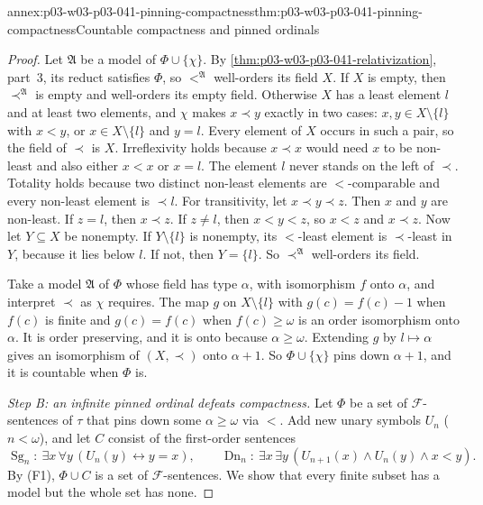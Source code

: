 \begin{annexitem}{annex:p03-w03-p03-041-pinning-compactness}{thm:p03-w03-p03-041-pinning-compactness}{Countable compactness and pinned ordinals}
\begin{proof}
Let \(\mathfrak A\) be a model of \(\Phi\cup\{\chi\}\). By
\cref{thm:p03-w03-p03-041-relativization}, part~3, its reduct satisfies
\(\Phi\), so \(<^{\mathfrak A}\) well-orders its field \(X\). If \(X\) is
empty, then \(\prec^{\mathfrak A}\) is empty and well-orders its empty
field. Otherwise \(X\) has a least element \(l\) and at least two elements,
and \(\chi\) makes \(x\prec y\) exactly in two cases: \(x,y\in X\setminus\{l\}\)
with \(x<y\), or \(x\in X\setminus\{l\}\) and \(y=l\). Every element of
\(X\) occurs in such a pair, so the field of \(\prec\) is \(X\).
Irreflexivity holds because \(x\prec x\) would need \(x\) to be
non-least and also either \(x<x\) or \(x=l\). The element \(l\) never
stands on the left of \(\prec\). Totality holds because two distinct
non-least elements are \(<\)-comparable and every non-least element is
\(\prec l\). For transitivity, let \(x\prec y\prec z\). Then \(x\) and
\(y\) are non-least. If \(z=l\), then \(x\prec z\). If \(z\neq l\), then
\(x<y<z\), so \(x<z\) and \(x\prec z\). Now let \(Y\subseteq X\) be nonempty.
If \(Y\setminus\{l\}\) is nonempty, its \(<\)-least element is
\(\prec\)-least in \(Y\), because it lies below \(l\). If not, then
\(Y=\{l\}\). So \(\prec^{\mathfrak A}\) well-orders its field.

Take a model \(\mathfrak A\) of \(\Phi\) whose field has type \(\alpha\),
with isomorphism \(f\) onto \(\alpha\), and interpret \(\prec\) as \(\chi\)
requires. The map \(g\) on \(X\setminus\{l\}\) with \(g(c)=f(c)-1\) when
\(f(c)\) is finite and \(g(c)=f(c)\) when \(f(c)\geq\omega\) is an order
isomorphism onto \(\alpha\). It is order preserving, and it is onto
because \(\alpha\geq\omega\). Extending \(g\) by \(l\mapsto\alpha\) gives
an isomorphism of \((X,\prec)\) onto \(\alpha+1\). So
\(\Phi\cup\{\chi\}\) pins down \(\alpha+1\), and it is countable when
\(\Phi\) is.

\emph{Step B: an infinite pinned ordinal defeats compactness.} Let
\(\Phi\) be a set of \(\mathcal F\)-sentences of \(\tau\) that pins down
some \(\alpha\geq\omega\) via \(<\). Add new unary symbols \(U_n\)
(\(n<\omega\)), and let \(C\) consist of the first-order sentences
\[
 \operatorname{Sg}_n:\ \exists x\,\forall y\,(U_n(y)\leftrightarrow y=x),
 \qquad
 \operatorname{Dn}_n:\ \exists x\,\exists y\,(U_{n+1}(x)\land U_n(y)\land x<y).
\]
By (F1), \(\Phi\cup C\) is a set of \(\mathcal F\)-sentences. We show that
every finite subset has a model but the whole set has none.


\end{proof}
\end{annexitem}
